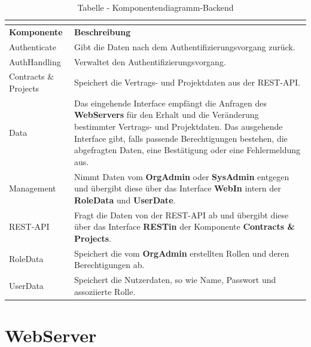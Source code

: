 \begin{longtable}[h]{|p{2.5cm}|p{10.0cm}|}
	\caption{Tabelle - Komponentendiagramm-Backend}
	\centering
	\label{tab:table_comp_backend}
	\endlastfoot
	\hline \multicolumn{2}{|r|}{{Weitergeführt auf der folgenden Seite}} \\ \hline
	\endfoot
	\endhead
	\hline
	\textbf{Komponente} & \textbf{Beschreibung} \\ 
	\hline
	Authenticate & Gibt die Daten nach dem Authentifizierungsvorgang zurück. \\
	\hline
	AuthHandling & Verwaltet den Authentifizierungsvorgang.  \\
	\hline
	Contracts {\&} Projects & Speichert die Vertrags- und Projektdaten aus der REST-API. \\
	\hline
	Data & Das eingehende Interface empfängt die Anfragen des \textbf{WebServers} für den Erhalt und die Veränderung bestimmter Vertrags- und Projektdaten. Das ausgehende Interface gibt, falls passende Berechtigungen bestehen, die abgefragten Daten, eine Bestätigung oder eine Fehlermeldung aus.  \\
	\hline
	Management & Nimmt Daten vom \textbf{OrgAdmin} oder \textbf{SysAdmin} entgegen und übergibt diese über das Interface \textbf{WebIn} intern der \textbf{RoleData} und \textbf{UserDate}. \\
	\hline
	REST-API & Fragt die Daten von der REST-API ab und übergibt diese über das Interface \textbf{RESTin} der Komponente \textbf{Contracts {\&} Projects}. \\
	\hline
	RoleData & Speichert die vom \textbf{OrgAdmin} erstellten Rollen und deren Berechtigungen ab. \\
	\hline
	UserData & Speichert die Nutzerdaten, so wie Name, Passwort und assoziierte Rolle. \\
	\hline
\end{longtable}

\clearpage

\section{WebServer}

